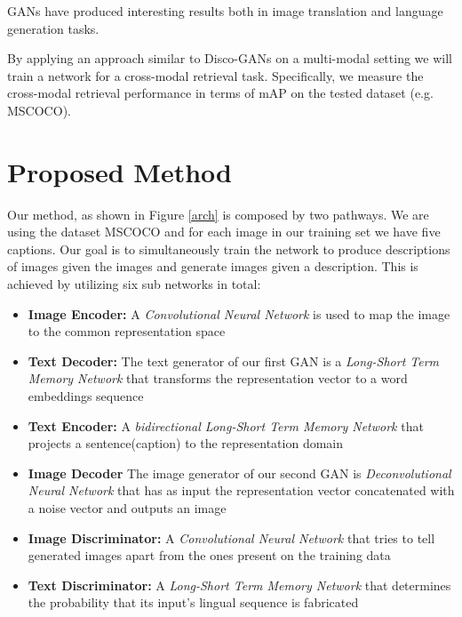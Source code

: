 \documentclass[twocolumn]{article}
\begin{document}
GANs have produced interesting results both in image translation\cite{DBLP:journals/corr/KimCKLK17, DBLP:journals/corr/LiuBK17}  and language generation tasks\cite{DBLP:journals/corr/RajeswarSDPC17}. 

By applying an approach similar to Disco-GANs\cite{DBLP:journals/corr/KimCKLK17} on a multi-modal setting we will train a network for a cross-modal retrieval task. Specifically, we measure the cross-modal retrieval performance in terms of mAP on the tested dataset (e.g. MSCOCO\cite{dblp:journals/corr/linmbhprdz14}). 

\section{Proposed Method}

Our method, as shown in Figure \ref{arch} is composed by two pathways. We are using the dataset MSCOCO and for each image in our training set we have five captions. Our goal is to simultaneously train the network to produce descriptions of images given the images and generate images given a description. This is achieved by utilizing six sub networks in total:
\begin{itemize}
  \item \textbf{Image Encoder:} A \textit{Convolutional Neural Network} is used to map the image to the common representation space
  \item \textbf{Text Decoder:} The text generator of our first GAN is a \textit{Long-Short Term Memory Network} that transforms the representation vector to a word embeddings sequence
  \item \textbf{Text Encoder:} A \textit{bidirectional Long-Short Term Memory Network} that projects a sentence(caption) to the representation domain
  \item \textbf{Image Decoder} The image generator of our second GAN is \textit{Deconvolutional Neural Network} that has as input the representation vector concatenated with a noise vector and outputs an image
  \item \textbf{Image Discriminator:} A \textit{Convolutional Neural Network} that tries to tell generated images apart from the ones present on the training data
  \item \textbf{Text Discriminator:} A \textit{Long-Short Term Memory Network} that determines the probability that its input's lingual sequence is fabricated 

\end{itemize}
\end{document}
